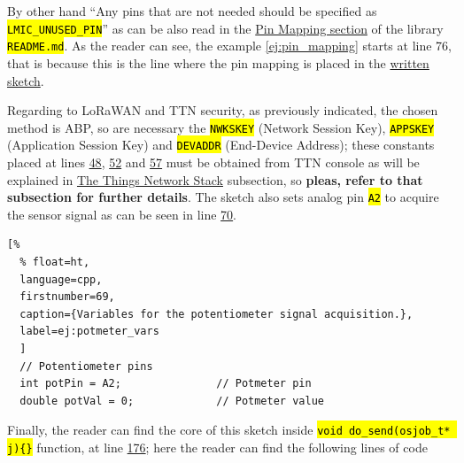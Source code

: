 \documentclass[11pt,a4paper,dvipsnames,twoside]{article}
\newcommand{\cmd}[1] {\hl{\texttt{#1}}}
\begin{document}
By other hand \enquote{Any pins that are not needed should be specified as \cmd{LMIC\_UNUSED\_PIN}} as can be also read in the \href{https://github.com/mcci-catena/arduino-lmic#pin-mapping}{Pin Mapping section} of the library \cmd{README.md}. As the reader can see, the example \ref{ej:pin_mapping} starts at line 76, that is because this is the line where the pin mapping is placed in the \href{https://github.com/WyRe/lora-arduino-dendrometer/blob/master/src/arduino/dendro/dendro.ino#L76}{written sketch}.

Regarding to LoRaWAN and TTN security, as previously indicated, the chosen method is ABP, so are necessary the \cmd{NWKSKEY} (Network Session Key), \cmd{APPSKEY} (Application Session Key) and \cmd{DEVADDR} (End-Device Address); these constants placed at lines \href{https://github.com/WyRe/lora-arduino-dendrometer/blob/master/src/arduino/dendro/dendro.ino#L48}{48}, \href{https://github.com/WyRe/lora-arduino-dendrometer/blob/master/src/arduino/dendro/dendro.ino#L52}{52} and \href{https://github.com/WyRe/lora-arduino-dendrometer/blob/master/src/arduino/dendro/dendro.ino#L57}{57} must be obtained from TTN console as will be explained in \hyperref[sssec:TTN_Stack]{The Things Network Stack} subsection, so \textbf{pleas, refer to that subsection for further details}. The sketch also sets analog pin \cmd{A2} to acquire the sensor signal as can be seen in line \href{https://github.com/WyRe/lora-arduino-dendrometer/blob/master/src/arduino/dendro/dendro.ino#L70}{70}.%

\begin{lstlisting}[%
  % float=ht,
  language=cpp,
  firstnumber=69,
  caption={Variables for the potentiometer signal acquisition.},
  label=ej:potmeter_vars
  ]
  // Potentiometer pins
  int potPin = A2;               // Potmeter pin
  double potVal = 0;             // Potmeter value
\end{lstlisting}

Finally, the reader can find the core of this sketch inside \cmd{void do\_send(osjob\_t* j)\{\}} function, at line \href{https://github.com/WyRe/lora-arduino-dendrometer/blob/master/src/arduino/dendro/dendro.ino#L176}{176}; here the reader can find the following lines of code
\end{document}

